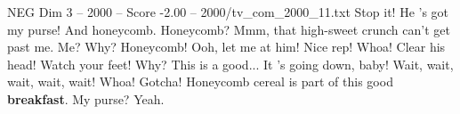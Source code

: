 \begin{textsample}{NEG Dim 3 – 2000 – Score -2.00 – 2000/tv\_com\_2000\_11.txt}  \label{ex:f3_neg_001}
Stop it!
He 's got my purse!
And honeycomb.
Honeycomb?
Mmm, that high-sweet crunch can't get past me.
Me?
Why?
Honeycomb!
Ooh, let me at him!
Nice rep!
Whoa!
Clear his head!
Watch your feet!
Why?
This is a good...
It 's going down, baby!
Wait, wait, wait, wait, wait!
Whoa!
Gotcha!
Honeycomb cereal is part of this good \textbf{breakfast}.
My purse?
Yeah.

\end{textsample}
